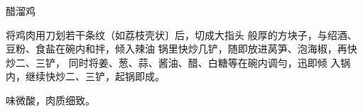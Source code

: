 \begin{recipe}{醋溜鸡}

\ingredients




\cooking

将鸡肉用刀划若干条纹（如荔枝壳状〕后，切成大指头 般厚的方块子，与绍酒、豆粉、食盐在碗内和拌，倾入辣油 锅里快炒几铲，随即放进莴笋、泡海椒，再快炒二、三铲， 同时将姜、葱、蒜、酱油、醋、白糖等在碗内调勻，迅即倾 入锅内，继续快炒二、三铲，起锅即成。

\notes

味微酸，肉质细致。

\end{recipe}


